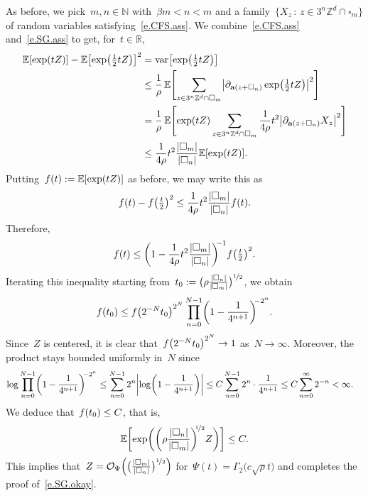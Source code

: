 \documentclass[11pt,twoside]{article} %
\let\oldsquare\square %
\renewcommand{\square}{\oldsquare}
\numberwithin{equation}{section}
\theoremstyle{definition}
\let\originalleft\left
\let\originalright\right
\renewcommand{\left}{\mathopen{}\mathclose\bgroup\originalleft}
\renewcommand{\right}{\aftergroup\egroup\originalright}
\newcommand*{\N}{\ensuremath{\mathbb{N}}}
\newcommand*{\R}{\ensuremath{\mathbb{R}}}
\newcommand*{\Zd}{\ensuremath{\mathbb{Z}^d}}
\renewcommand{\a}{\mathbf{a}}
\newcommand{\cu}{\square}
\newcommand{\E}{\mathbb{E}}
\renewcommand{\O}{\mathcal{O}}
\DeclareMathOperator{\var}{var}
\begin{document}
As before, we pick~$m,n\in\N$ with~$\beta m<n<m$ and a family~$\{ X_z \,:\, z\in 3^n\Zd\cap \cu_m\}$ of random variables satisfying~\eqref{e.CFS.ass}. We combine~\eqref{e.CFS.ass} and~\eqref{e.SG.ass} to get, for~$t\in\R$,
\begin{align*}
\E \left[ \exp(tZ) \right] - \E\left[ \exp\left(\tfrac12tZ\right) \right]^2 
&
= 
\var\left[  \exp\left(\tfrac12tZ\right)   \right]
\\ & 
\leq 
\frac1\rho\,
\E \Biggl[
\sum_{z\in 3^n\Zd \cap \cu_m}
\left| \partial_{\a(z+\cu_n)} \exp\left( \tfrac12tZ \right)
\right|^2
\Biggr]
\\ & 
=
\frac1\rho\,
\E \Biggl[  \exp\left( tZ \right) 
\sum_{z\in 3^n\Zd \cap \cu_m}
\frac1{4\rho}t^2 
\left| \partial_{\a(z+\cu_n)} X_z \right|^2
\Biggr]
\\ & 
\leq 
\frac1{4\rho}t^2 \frac{|\cu_m|}{|\cu_n|}
\E \left[  \exp\left( tZ \right) \right].
\end{align*}
Putting~$f(t):= \E \left[  \exp\left( t Z \right) \right]$ as before, we may write this as 
\begin{equation*} \label{}
f(t) - f\left(\tfrac t2\right)^2
\leq 
\frac1{4\rho}t^2 \frac{|\cu_m|}{|\cu_n|} f(t).
\end{equation*}
Therefore, 
\begin{equation*} \label{}
f(t) \leq \biggl( 1 - \frac1{4\rho}t^2 \frac{|\cu_m|}{|\cu_n|} \biggr)^{\!\!-1} f \left(\tfrac t2\right)^2.
\end{equation*}
Iterating this inequality starting from~$t_0 := \bigl( \rho \frac{|\cu_n|}{|\cu_m|}  \bigr)^{\nicefrac12}$, we obtain
\begin{equation*} \label{}
f\left( t_0 \right) 
\leq
f\left( 2^{-N}t_0 \right)^{2^N}
\prod_{n=0}^{N-1} \biggl( 1 - \frac1{4^{n+1}} \biggr)^{\!\!-2^n} .
\end{equation*}
Since~$Z$ is centered, it is clear that~$f\left(2^{-N} t_0 \right)^{2^N} \to 1$ as~$N\to \infty$. Moreover, the product stays bounded uniformly in~$N$ since
\begin{align*} \label{}
\log \prod_{n=0}^{N-1} \left( 1 - \frac1{4^{n+1}} \right)^{\!\!-2^n}
&
\leq
\sum_{n=0}^{N-1} 2^n
\left| \log \left( 1 - \frac1{4^{n+1}} \right) \right|
\leq
C \sum_{n=0}^{N-1} 2^n \cdot \frac1{4^{n+1}}
\leq C \sum_{n=0}^\infty 2^{-n} < \infty. 
\end{align*}
We deduce that~$f\left(t_0\right) \leq C$, that is, 
\begin{equation*} \label{}
\E \biggl[ \exp\biggl( \biggl( \rho \frac{|\cu_n|}{|\cu_m|}  \biggr)^{\!\!\nicefrac12} Z \biggr) \biggr] \leq C. 
\end{equation*}
This implies that~$Z = \O_{\Psi}\Big (\bigl( \frac{|\cu_m|}{|\cu_n|}\bigr)^{\nicefrac12}   \Bigr)$ for~$\Psi(t)=\Gamma_2\bigl(c\sqrt{\rho}t \bigr)$ and completes the proof of~\eqref{e.SG.okay}. 
\end{document}
